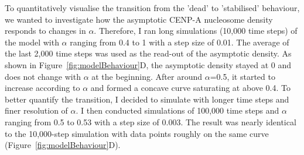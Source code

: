 To quantitatively visualise the transition from the 'dead' to 'stabilised' behaviour, we wanted to investigate how the asymptotic CENP-A nucleosome density responds to changes in $\alpha$. Therefore, I ran long simulations (10,000 time steps) of the model with $\alpha$ ranging from 0.4 to 1 with a step size of 0.01. The average of the last 2,000 time steps was used as the read-out of the asymptotic density. As shown in Figure~\ref{fig:modelBehaviour}D, the asymptotic density stayed at 0 and does not change with $\alpha$ at the beginning. After around $\alpha$=0.5, it started to increase according to $\alpha$ and formed a concave curve saturating at above 0.4. To better quantify the transition, I decided to simulate with longer time steps and finer resolution of $\alpha$. I then conducted simulations of 100,000 time steps and $\alpha$ ranging from 0.5 to 0.53 with a step size of 0.003. The result was nearly identical to the 10,000-step simulation with data points roughly on the same curve (Figure~\ref{fig:modelBehaviour}D). 

